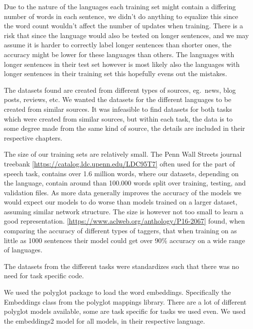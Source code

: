 Due to the nature of the languages each training set might contain a differing
number of words in each sentence, we didn't do anything to equalize this since
the word count wouldn't affect the number of updates when training. There is a
risk that since the language would also be tested on longer sentences, and we
may assume it is harder to correctly label longer sentences than shorter ones,
the accuracy might be lower for these languages than others. The languages with
longer sentences in their test set however is most likely also the languages
with longer sentences in their training set this hopefully evens out the
mistakes.

The datasets found are created from different types of sources, eg.\ news, blog
posts, reviews, etc. We wanted the datasets for the different languages to be
created from similar sources. It was infeasible to find datasets for both tasks
which were created from similar sources, but within each task, the data is to
some degree made from the same kind of source, the details are included in their
respective chapters.

The size of our training sets are relatively small. The Penn Wall Streets
journal treebank \ref{https://catalog.ldc.upenn.edu/LDC95T7} often used for the
part of speech task, contains over 1.6 million words, where our datasets,
depending on the language, contain around than 100.000 words split over
training, testing, and validation files. As more data generally improves the
accuracy of the models we would expect our models to do worse than models
trained on a larger dataset, assuming similar network structure. The size is
however not too small to learn a good representation.
\ref{https://www.aclweb.org/anthology/P16-2067} found, when comparing the
accuracy of different types of taggers, that when training on as little as 1000
sentences their model could get over 90\% accuracy on a wide range of languages.


The datasets from the different tasks were standardizes such that there was no
need for task specific code. 

We used the polyglot package to load the word embeddings. Specifically the
Embeddings class from the polyglot mappings library. There are a lot of
different polyglot models available, some are task specific for tasks we used
even. We used the embeddings2 model for all models, in their respective
language. 

\pagebreak
